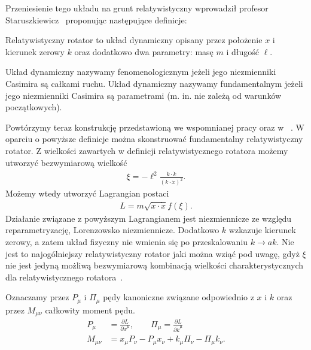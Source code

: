 Przeniesienie tego układu na grunt relatywistyczny wprowadził 
profesor Staruszkiewicz~\cite{star2008} proponując następujące 
definicje:
\begin{definition}
Relatywistyczny rotator to układ dynamiczny
 opisany przez położenie $x$ i kierunek
zerowy $k$ oraz dodatkowo dwa parametry: masę $m$ i długość $\ell$.
\end{definition}
\begin{definition}
Układ dynamiczny  nazywamy fenomenologicznym jeżeli jego niezmienniki Casimira są 
całkami ruchu. Układ dynamiczny nazywamy fundamentalnym jeżeli jego niezmienniki
Casimira są parametrami (m. in. nie zależą od warunków początkowych).
\end{definition}
Powtórzymy teraz konstrukcję przedstawioną we wspomnianej pracy oraz w
~\cite{Kassandrov2009, Bratek2009nonuniq}.
W oparciu o powyższe definicje można skonstruować fundamentalny
relatywistyczny rotator. Z wielkości zawartych w definicji relatywistycznego 
rotatora możemy utworzyć bezwymiarową wielkość
\begin{align}
\xi = - \ell^2 \frac{\dot{k} \cdot \dot{k}}{ ( k \cdot \dot{x})^2 }.
\end{align}
Możemy wtedy utworzyć Lagrangian postaci
\begin{align}\label{rotatorStar}
L = m \sqrt{ \dot{x} \cdot \dot{x} } f( \xi ) .
\end{align}
Działanie związane z powyższym Lagrangianem 
jest niezmiennicze ze względu reparametryzację, 
Lorenzowsko niezmiennicze. Dodatkowo $k$ wzkazuje kierunek zerowy, a zatem
 układ fizyczny nie wmienia się
po przeskalowaniu $k \to a k$. 
Nie jest to najogólniejszy relatywistyczny 
rotator jaki można wziąć pod uwagę, gdyż $\xi$ nie jest jedyną 
możliwą bezwymiarową kombinacją wielkości charakterystycznych 
dla relatywistycznego rotatora~\cite{Bratek2009nonuniq}.


Oznaczamy przez $P_\mu$ i $\Pi_\mu$ pędy kanoniczne związane 
odpowiednio z $x$ i $k$ oraz przez $M_{\mu\nu}$ całkowity moment pędu.
\begin{align}
P_\mu &= \frac{\partial L}{\partial \dot{x}^\mu}, \qquad
\Pi_\mu = \frac{\partial L}{\partial \dot{k}^\mu} \\
M_{\mu\nu} &= x_\mu P_\nu - P_\mu x_\nu + k_\mu \Pi_\nu - \Pi_\mu k_\nu.
\end{align}

